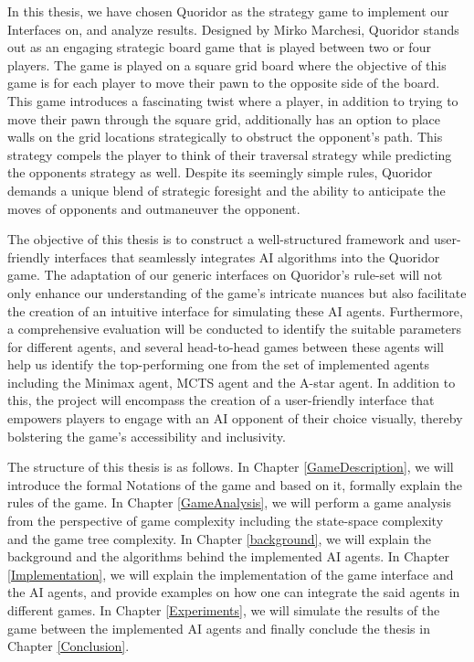 In this thesis, we have chosen Quoridor as the strategy game to implement our Interfaces on, and analyze results. Designed by Mirko Marchesi, Quoridor stands out as an engaging strategic board game that is played between two or four players. The game is played on a square grid board where the objective of this game is for each player to move their pawn to the opposite side of the board. This game introduces a fascinating twist where a player, in addition to trying to move their pawn through the square grid, additionally has an option to place walls on the grid locations strategically to obstruct the opponent's path. This strategy compels the player to think of their traversal strategy while predicting the opponents strategy as well. Despite its seemingly simple rules, Quoridor demands a unique blend of strategic foresight and the ability to anticipate the moves of opponents and outmaneuver the opponent.

The objective of this thesis is to construct a well-structured framework and user-friendly interfaces that seamlessly integrates AI algorithms into the Quoridor game. The adaptation of our generic interfaces on Quoridor's rule-set will not only enhance our understanding of the game's intricate nuances but also facilitate the creation of an intuitive interface for simulating these AI agents. Furthermore, a comprehensive evaluation will be conducted to identify the suitable parameters for different agents, and several head-to-head games between these agents will help us identify the top-performing one from the set of implemented agents including the Minimax agent, \gls{MCTS} agent and the A-star agent. In addition to this, the project will encompass the creation of a user-friendly interface that empowers players to engage with an AI opponent of their choice visually, thereby bolstering the game's accessibility and inclusivity.

The structure of this thesis is as follows. In Chapter \ref{GameDescription}, we will introduce the formal Notations of the game and based on it, formally explain the rules of the game. In Chapter \ref{GameAnalysis}, we will perform a game analysis from the perspective of game complexity including the state-space complexity and the game tree complexity. In Chapter \ref{background}, we will explain the background and the algorithms behind the implemented AI agents.  In Chapter \ref{Implementation}, we will explain the implementation of the game interface and the AI agents, and provide examples on how one can integrate the said agents in different games. In Chapter \ref{Experiments}, we will simulate the results of the game between the implemented AI agents and finally conclude the thesis in Chapter \ref{Conclusion}.